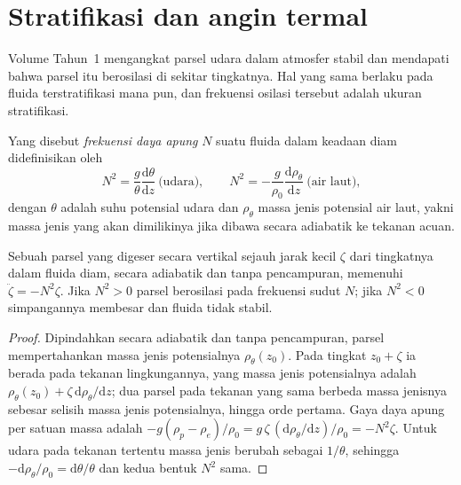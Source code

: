 \section{Stratifikasi dan angin termal}\label{sec:b3:gfd-foundations:stratification}

Volume Tahun~1 mengangkat parsel udara dalam atmosfer stabil dan mendapati
bahwa parsel itu berosilasi di sekitar tingkatnya. Hal yang sama berlaku pada fluida terstratifikasi mana pun,
dan frekuensi osilasi tersebut adalah ukuran stratifikasi.

\begin{definition}\label{def:b3:gfd-foundations:buoyancy}
Yang disebut \emph{frekuensi daya apung} $N$ suatu fluida dalam
keadaan diam didefinisikan oleh
\[
N^2 = \frac{g}{\theta}\frac{\mathrm d\theta}{\mathrm dz}\ \text{(udara)},
\qquad
N^2 = -\frac{g}{\rho_0}\frac{\mathrm d\rho_\theta}{\mathrm dz}\ \text{(air laut)},
\]
dengan $\theta$ adalah suhu potensial udara dan $\rho_\theta$
massa jenis potensial air laut, yakni massa jenis yang akan dimilikinya jika dibawa
secara adiabatik ke tekanan acuan.
\end{definition}

\begin{theorem}\label{thm:b3:gfd-foundations:buoyancy}
Sebuah parsel yang digeser secara vertikal sejauh jarak kecil $\zeta$ dari tingkatnya dalam
fluida diam, secara adiabatik dan tanpa pencampuran, memenuhi $\ddot\zeta =
-N^2\zeta$. Jika $N^2 > 0$ parsel berosilasi pada frekuensi sudut $N$; jika
$N^2 < 0$ simpangannya membesar dan fluida tidak stabil.
\end{theorem}

\begin{proof}
Dipindahkan secara adiabatik dan tanpa pencampuran, parsel mempertahankan
massa jenis potensialnya $\rho_\theta(z_0)$. Pada tingkat $z_0 + \zeta$ ia berada pada tekanan
lingkungannya, yang massa jenis potensialnya adalah $\rho_\theta(z_0) +
\zeta\,\mathrm d\rho_\theta/\mathrm dz$; dua parsel pada tekanan yang sama
berbeda massa jenisnya sebesar selisih massa jenis potensialnya, hingga
orde pertama. Gaya daya apung per satuan massa adalah $-g(\rho_p - \rho_e)/\rho_0 =
g\,\zeta\,(\mathrm d\rho_\theta/\mathrm dz)/\rho_0 = -N^2\zeta$. Untuk udara pada
tekanan tertentu massa jenis berubah sebagai $1/\theta$, sehingga $-\mathrm
d\rho_\theta/\rho_0 = \mathrm d\theta/\theta$ dan kedua bentuk $N^2$
sama.
\end{proof}

